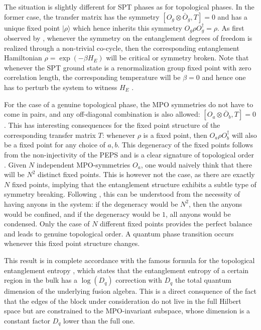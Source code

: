 \documentclass[rmp,aps,reprint,superscriptaddress,nobalancelastpage]{revtex4-1}
\begin{document}
The situation is slightly different for SPT phases as for topological phases. In the former case, the transfer matrix has the symmetry $[O_g\otimes \bar{O}_g,T]=0$ and has a unique fixed point $|\rho\rangle$ which hence inherits this symmetry $O_g\rho O_g^\dagger=\rho$. As first observed by \citet{chen:2d-spt-phases-peps-ghz}, whenever the symmetry on the entanglement degrees of freedom is realized through a non-trivial co-cycle, then the corresponding entanglement Hamiltonian $\rho=\exp(-\beta H_E)$ will be critical or symmetry broken. Note that whenever the SPT ground state is a renormalization group fixed point with zero correlation length, the corresponding temperature will be $\beta=0$ and hence one has to perturb the system to witness $H_E$ \cite{bultinck2018global}.

For the case of a genuine topological phase, the MPO symmetries do not have to come in pairs, and any off-diagonal combination is also allowed: $[O_a\otimes \bar{O}_b,T]=0$. This has interesting consequences for the fixed point structure of the corresponding transfer matrix $T$: whenever $\rho$ is a fixed point, then $O_a\rho O_b^\dagger$ will also be a fixed point for any choice of $a,b$. This degeneracy of the fixed points follows from the non-injectivity of the PEPS and is a clear signature
of topological order \cite{schuch:topo-top}. Given $N$ independent MPO-symmetries $O_a$, one would naively think that there will be $N^2$ distinct fixed points. This is however not the case, as there are exactly $N$ fixed points, implying that the entanglement structure exhibits a subtle type of symmetry breaking. Following \cite{haegeman:shadows}, this can be understood from the necessity of having anyons in the system: if the degeneracy would be $N^2$, then the anyons would be confined, and if the degeneracy would be $1$, all anyons would be condensed. Only the case of $N$ different fixed points provides the perfect balance and leads to genuine topological order. A quantum phase transition occurs whenever this fixed point structure changes.

This result is in complete accordance with the famous formula for the topological entanglement entropy \cite{kitaev:topological-entropy,levin:topological-entropy}, which states that the entanglement entropy of a certain region in the bulk has a $\log(D_q)$ correction with $D_q$ the total quantum dimension of the underlying fusion algebra. This is a direct consquence of the fact that the edges of the block under consideration do not live in the full Hilbert space but are constrained to the MPO-invariant subspace, whose dimension is a constant factor $D_q$ lower than the full one.
\end{document}
